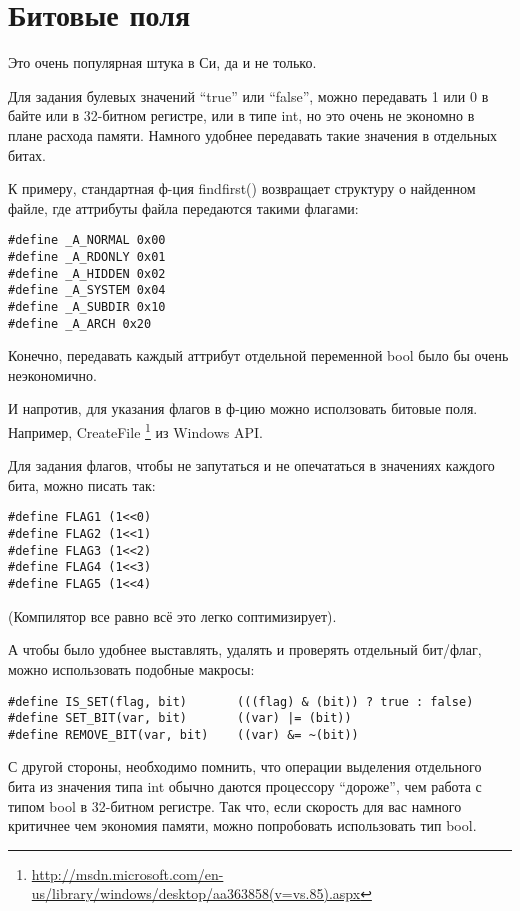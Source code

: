 ﻿\section{Битовые поля}

Это очень популярная штука в Си, да и не только.

Для задания булевых значений ``true'' или ``false'', можно передавать 1 или 0 в байте или в 32-битном регистре,
или в типе int, но это очень не экономно в плане расхода памяти. Намного удобнее передавать такие значения в отдельных
битах.

К примеру, стандартная ф-ция findfirst() возвращает структуру о найденном файле, где аттрибуты файла передаются
такими флагами:

\begin{lstlisting}
#define _A_NORMAL 0x00
#define _A_RDONLY 0x01
#define _A_HIDDEN 0x02
#define _A_SYSTEM 0x04
#define _A_SUBDIR 0x10
#define _A_ARCH 0x20
\end{lstlisting}

Конечно, передавать каждый аттрибут отдельной переменной bool было бы очень неэкономично.

И напротив, для указания флагов в ф-цию можно исползовать битовые поля. 
Например, CreateFile
\footnote{\url{http://msdn.microsoft.com/en-us/library/windows/desktop/aa363858(v=vs.85).aspx}} из Windows API.

Для задания флагов, чтобы не запутаться и не опечататься в значениях каждого бита, можно писать так:

\begin{lstlisting}
#define FLAG1 (1<<0)
#define FLAG2 (1<<1)
#define FLAG3 (1<<2)
#define FLAG4 (1<<3)
#define FLAG5 (1<<4)
\end{lstlisting}

(Компилятор все равно всё это легко соптимизирует).

А чтобы было удобнее выставлять, удалять и проверять отдельный бит/флаг, можно использовать подобные макросы:

\begin{lstlisting}
#define IS_SET(flag, bit)       (((flag) & (bit)) ? true : false)
#define SET_BIT(var, bit)       ((var) |= (bit))
#define REMOVE_BIT(var, bit)    ((var) &= ~(bit))
\end{lstlisting}

С другой стороны, необходимо помнить, что операции выделения отдельного бита из значения типа int 
обычно даются процессору ``дороже'', чем работа с типом bool в 32-битном регистре. 
Так что, если скорость для вас намного критичнее чем
экономия памяти, можно попробовать использовать тип bool.

